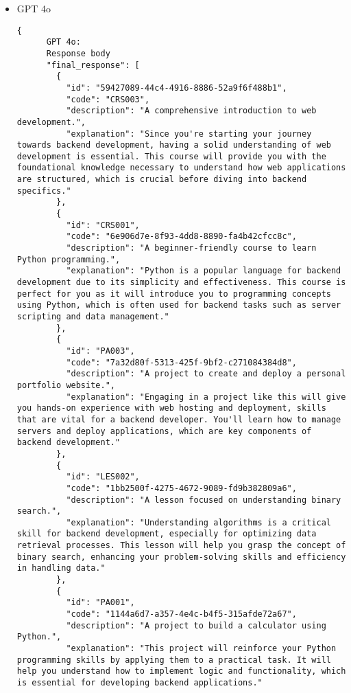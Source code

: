 \begin{itemize}
\begin{lstlisting}[breaklines=true]
            }
          ]
        }
      \end{lstlisting}
    \item GPT 4o
    \begin{lstlisting}[breaklines=true]
    {
      GPT 4o:
      Response body
      "final_response": [
        {
          "id": "59427089-44c4-4916-8886-52a9f6f488b1",
          "code": "CRS003",
          "description": "A comprehensive introduction to web development.",
          "explanation": "Since you're starting your journey towards backend development, having a solid understanding of web development is essential. This course will provide you with the foundational knowledge necessary to understand how web applications are structured, which is crucial before diving into backend specifics."
        },
        {
          "id": "CRS001",
          "code": "6e906d7e-8f93-4dd8-8890-fa4b42cfcc8c",
          "description": "A beginner-friendly course to learn Python programming.",
          "explanation": "Python is a popular language for backend development due to its simplicity and effectiveness. This course is perfect for you as it will introduce you to programming concepts using Python, which is often used for backend tasks such as server scripting and data management."
        },
        {
          "id": "PA003",
          "code": "7a32d80f-5313-425f-9bf2-c271084384d8",
          "description": "A project to create and deploy a personal portfolio website.",
          "explanation": "Engaging in a project like this will give you hands-on experience with web hosting and deployment, skills that are vital for a backend developer. You'll learn how to manage servers and deploy applications, which are key components of backend development."
        },
        {
          "id": "LES002",
          "code": "1bb2500f-4275-4672-9089-fd9b382809a6",
          "description": "A lesson focused on understanding binary search.",
          "explanation": "Understanding algorithms is a critical skill for backend development, especially for optimizing data retrieval processes. This lesson will help you grasp the concept of binary search, enhancing your problem-solving skills and efficiency in handling data."
        },
        {
          "id": "PA001",
          "code": "1144a6d7-a357-4e4c-b4f5-315afde72a67",
          "description": "A project to build a calculator using Python.",
          "explanation": "This project will reinforce your Python programming skills by applying them to a practical task. It will help you understand how to implement logic and functionality, which is essential for developing backend applications."

\end{lstlisting}
\end{itemize}
